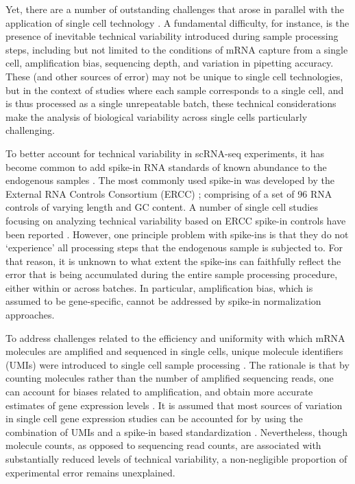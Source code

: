 Yet, there are a number of outstanding challenges that arose in parallel
with the application of single cell technology \citep{Stegle2015}. A
fundamental difficulty, for instance, is the presence of inevitable
technical variability introduced during sample processing steps,
including but not limited to the conditions of mRNA capture from a
single cell, amplification bias, sequencing depth, and variation in
pipetting accuracy. These (and other sources of error) may not be unique
to single cell technologies, but in the context of studies where each
sample corresponds to a single cell, and is thus processed as a single
unrepeatable batch, these technical considerations make the analysis of
biological variability across single cells particularly challenging.

To better account for technical variability in scRNA-seq experiments, it
has become common to add spike-in RNA standards of known abundance to
the endogenous samples \citep{Brennecke2013, Grun2014}. The most
commonly used spike-in was developed by the External RNA Controls
Consortium (ERCC) \citep{Jiang2011}; comprising of a set of 96 RNA
controls of varying length and GC content. A number of single cell
studies focusing on analyzing technical variability based on ERCC
spike-in controls have been reported \citep{Brennecke2013, Grun2014,
Ding2015, Vallejos2015}. However, one principle problem with
spike-ins is that they do not `experience' all processing steps that the
endogenous sample is subjected to. For that reason, it is unknown to
what extent the spike-ins can faithfully reflect the error that is being
accumulated during the entire sample processing procedure, either within
or across batches. In particular, amplification bias, which is assumed
to be gene-specific, cannot be addressed by spike-in normalization
approaches.

To address challenges related to the efficiency and uniformity with
which mRNA molecules are amplified and sequenced in single cells, unique
molecule identifiers (UMIs) were introduced to single cell sample
processing \citep{Kivioja2011, Fu2011, Casbon2011, Shiroguchi2012}.
The rationale is that by counting molecules rather than the number of
amplified sequencing reads, one can account for biases related to
amplification, and obtain more accurate estimates of gene expression
levels \citep{Jaitin2014, Islam2014, Grun2014}. It is assumed that most
sources of variation in single cell gene expression studies can be
accounted for by using the combination of UMIs and a spike-in based
standardization \citep{Islam2014, Vallejos2015}. Nevertheless, though
molecule counts, as opposed to sequencing read counts, are associated
with substantially reduced levels of technical variability, a
non-negligible proportion of experimental error remains unexplained.

